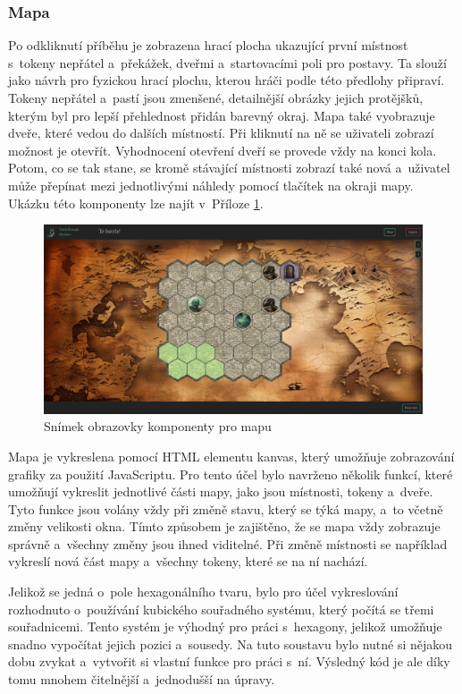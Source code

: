 \subsubsection*{Mapa}
Po odkliknutí příběhu je zobrazena hrací plocha ukazující první místnost s~tokeny nepřátel a~překážek, dveřmi a~startovacími poli pro postavy. Ta slouží jako návrh pro fyzickou hrací plochu, kterou hráči podle této předlohy připraví. Tokeny nepřátel a~pastí jsou zmenšené, detailnější obrázky jejich protějšků, kterým byl pro lepší přehlednost přidán barevný okraj. Mapa také vyobrazuje dveře, které vedou do dalších místností. Při kliknutí na ně se uživateli zobrazí možnost je otevřít. Vyhodnocení otevření dveří se provede vždy na konci kola. Potom, co se tak stane, se kromě stávající místnosti zobrazí také nová a~uživatel může přepínat mezi jednotlivými náhledy pomocí tlačítek na okraji mapy. Ukázku této komponenty lze najít v~Příloze \ref{fig:map}.

\begin{figure}[h]
  \centering
  \includegraphics[width=\textwidth]{resources/figures/TTS-Map.png}
  \caption{Snímek obrazovky komponenty pro mapu}
  \label{fig:map}
\end{figure}

Mapa je vykreslena pomocí HTML elementu kanvas, který umožňuje zobrazování grafiky za použití JavaScriptu. Pro tento účel bylo navrženo několik funkcí, které umožňují vykreslit jednotlivé části mapy, jako jsou místnosti, tokeny a~dveře. Tyto funkce jsou volány vždy při změně stavu, který se týká mapy, a~to včetně změny velikosti okna. Tímto způsobem je zajištěno, že se mapa vždy zobrazuje správně a~všechny změny jsou ihned viditelné. Při změně místnosti se například vykreslí nová část mapy a~všechny tokeny, které se na ní nachází.

Jelikož se jedná o~pole hexagonálního tvaru, bylo pro účel vykreslování rozhodnuto o~používání kubického souřadného systému, který počítá se třemi souřadnicemi. Tento systém je výhodný pro práci s~hexagony, jelikož umožňuje snadno vypočítat jejich pozici a~sousedy. Na tuto soustavu bylo nutné si nějakou dobu zvykat a~vytvořit si vlastní funkce pro práci s~ní. Výsledný kód je ale díky tomu mnohem čitelnější a~jednodušší na úpravy.

